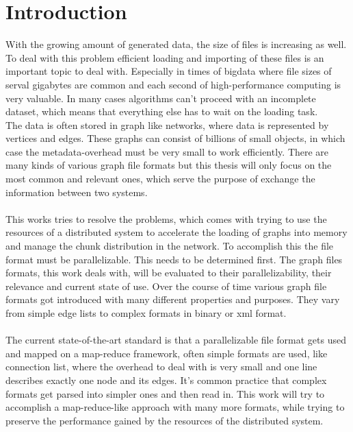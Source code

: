 \chapter{Introduction}
\label{Introduction}

With the growing amount of generated data, the size of files is increasing as well. To deal with this problem efficient loading and importing of these files is an important topic to deal with. Especially in times of bigdata where file sizes of serval gigabytes are common and each second of high-performance computing is very valuable. In many cases algorithms can’t proceed with an incomplete dataset, which means that everything else has to wait on the loading task.\\
The data is often stored in graph like networks, where data is represented by vertices and edges. These graphs can consist of billions of small objects, in which case the metadata-overhead must be very small to work efficiently. There are many kinds of various graph file formats but this thesis will only focus on the most common and relevant ones, which serve the purpose of exchange the information between two systems.\\\\
This works tries to resolve the problems, which comes with trying to use the resources of a distributed system to accelerate the loading of graphs into memory and manage the chunk distribution in the network. To accomplish this the file format must be parallelizable. This needs to be determined first. The graph files formats, this work deals with, will be evaluated to their parallelizability, their relevance and current state of use. Over the course of time various graph file formats got introduced with many different properties and purposes. They vary from simple edge lists to complex formats in binary or xml format.\\\\
The current state-of-the-art standard is that a parallelizable file format gets used and mapped on a map-reduce framework, often simple formats are used, like connection list, where the overhead to deal with is very small and one line describes exactly one node and its edges. It's common practice that complex formats get parsed into simpler ones and then read in. This work will try to accomplish a map-reduce-like approach with many more formats, while trying to preserve the performance gained by the resources of the distributed system.
